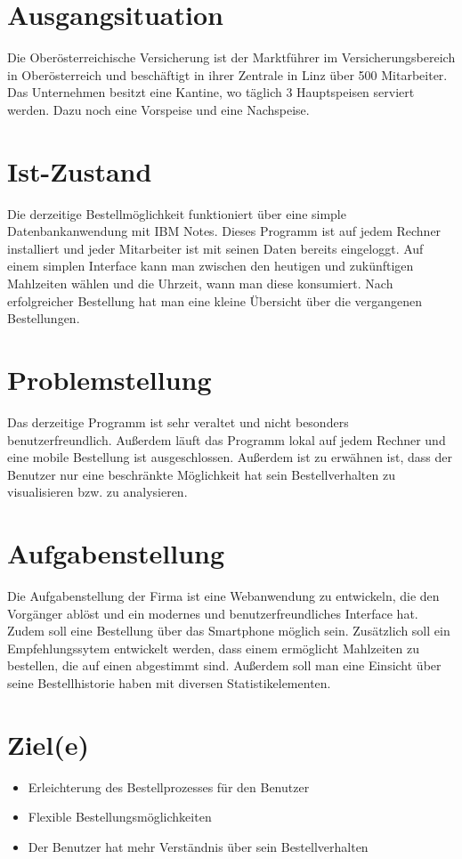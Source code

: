 \section{Ausgangsituation}
\author{Benjamin Besic}
Die Oberösterreichische Versicherung ist der Marktführer im Versicherungsbereich in Oberösterreich 
und beschäftigt in ihrer Zentrale in Linz über 500 Mitarbeiter.
Das Unternehmen besitzt eine Kantine, wo täglich 3 Hauptspeisen serviert werden. Dazu noch
eine Vorspeise und eine Nachspeise. 
\section{Ist-Zustand}
\author{Benjamin Besic}
Die derzeitige Bestellmöglichkeit funktioniert über eine simple Datenbankanwendung mit IBM Notes.
Dieses Programm ist auf jedem Rechner installiert und jeder Mitarbeiter ist mit seinen Daten bereits eingeloggt.
Auf einem simplen Interface kann man zwischen den heutigen und zukünftigen Mahlzeiten wählen und die Uhrzeit, wann man 
diese konsumiert. Nach erfolgreicher Bestellung hat man eine kleine Übersicht über die vergangenen Bestellungen.
\section{Problemstellung}
\author{Benjamin Besic}
Das derzeitige Programm ist sehr veraltet und nicht besonders benutzerfreundlich. Außerdem
läuft das Programm lokal auf jedem Rechner und eine mobile Bestellung ist ausgeschlossen.
Außerdem ist zu erwähnen ist, dass der Benutzer nur eine beschränkte Möglichkeit hat sein Bestellverhalten 
zu visualisieren bzw. zu analysieren.
\section{Aufgabenstellung}
\author{Benjamin Besic}
Die Aufgabenstellung der Firma ist eine Webanwendung zu entwickeln, die den Vorgänger ablöst
und ein modernes und benutzerfreundliches Interface hat. Zudem soll eine Bestellung über das Smartphone
möglich sein. Zusätzlich soll ein Empfehlungssytem entwickelt werden, dass einem ermöglicht Mahlzeiten zu 
bestellen, die auf einen abgestimmt sind. Außerdem soll man eine Einsicht über seine Bestellhistorie haben
mit diversen Statistikelementen.
\section{Ziel(e)}
\author{Benjamin Besic}
\begin{itemize}
    \item Erleichterung des Bestellprozesses für den Benutzer
    \item Flexible Bestellungsmöglichkeiten
    \item Der Benutzer hat mehr Verständnis über sein Bestellverhalten
\end{itemize}

